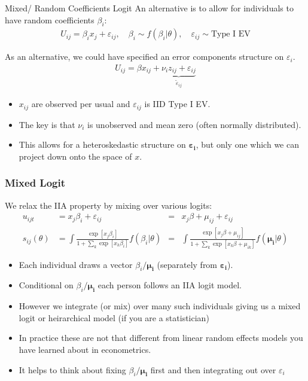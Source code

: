 \begin{frame}{Mixed/ Random Coefficients Logit}
An alternative is to allow for individuals to have \alert{random coefficients} $\beta_i$:
\begin{eqnarray*}
U_{ij} = \beta_i x_{j} +  \varepsilon_{ij}, \quad \beta_i \sim f( \beta_i | \theta),  \quad \varepsilon_{ij} \sim \text{Type I EV}
\end{eqnarray*}

As an alternative, we could have specified an error components structure on $\varepsilon_i$.
\begin{align*}
U_{ij} = \beta x_{ij} + \underbrace{\nu_i z_{ij} + \varepsilon_{ij}}_{\tilde{\varepsilon}_{ij}}
\end{align*}
\vspace{-0.8cm}
\begin{itemize}
\item $x_{ij}$ are observed per usual and $\varepsilon_{ij}$ is IID Type I EV.
\item The key is that $\nu_i$ is unobserved and mean zero (often normally distributed).
\item This allows for a heteroskedastic structure on $\boldsymbol{\varepsilon_{i}}$, but only one which we can project down onto the space of $x$.
\end{itemize}

\end{frame}


\begin{frame}
\frametitle{Mixed Logit}
We relax the IIA property by mixing over various logits:
\begin{align*}
u_{ijt} &= x_j \beta_i + \varepsilon_{ij}  
&=&  x_j \beta  + \mu_{ij}+ \varepsilon_{ij}   \\
s_{ij}(\theta) &= \int \frac{\exp[x_{j} \beta_i ]}{1+\sum_k \exp[x_{k} \beta_i ]} f(\beta_i | \theta) 
&=& \int \frac{\exp[x_{j} \beta + \mu_{ij} ]}{1+\sum_k \exp[x_{k} \beta+ \mu_{ik} ]} f(\boldsymbol{\mu_i} | \theta)
\end{align*}
 \begin{itemize}
 \item Each individual draws a vector $\beta_i\boldsymbol{/\mu_i}$ (separately from $\boldsymbol{\varepsilon_i}$).
 \item Conditional on $\beta_i\boldsymbol{/\mu_i}$ each person follows an IIA logit model.
 \item However we integrate (or mix) over many such individuals giving us a \alert{mixed logit} or \alert{heirarchical model} (if you are a statistician)
 \item In practice these are not that different from linear \alert{random effects models} you have learned about in econometrics.
 \item It helps to think about fixing $\beta_i\boldsymbol{/\mu_i}$ first and then integrating out over $\varepsilon_i$
 \end{itemize}
\end{frame}


